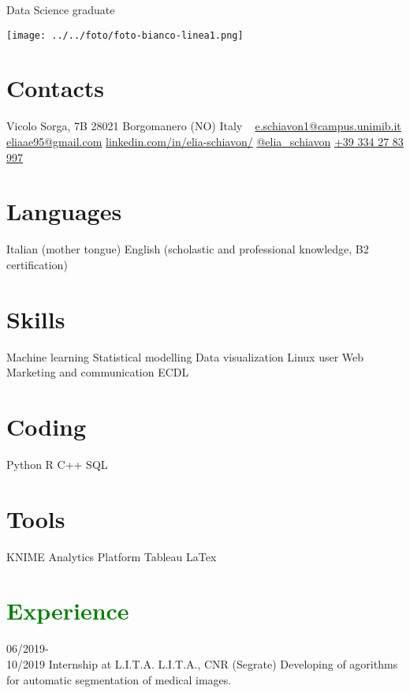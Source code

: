 \documentclass[a4paper]{friggeri-cv}
\begin{document}
       {Data Science graduate}



\begin{aside}
	{\texttt{[image: ../../foto/foto-bianco-linea1.png]}}
  \section{Contacts}
    Vicolo Sorga, 7B
    28021 Borgomanero (NO)
    Italy
    ~
    {\color{gray}{\FA \faEnvelope}} \href{mailto:e.schiavon1@campus.unimib.it}{e.schiavon1@campus.unimib.it}
    {\color{gray}{\FA \faEnvelope}} \href{mailto:eliaae95@gmail.com}{eliaae95@gmail.com}
    {\color{cyan}{\FA \faLinkedinSquare}} \href{https://www.linkedin.com/in/elia-schiavon/}{linkedin.com/in/elia-schiavon/}
    {\color{blue}{\FA \faTwitter}} \href{https://twitter.com/elia_schiavon?s=09}{@elia\_schiavon}
    {\color{black}{\FA \faPhone}} \href{}{+39 334 27 83 997}
  \section{Languages}
    Italian (mother tongue)
    English (scholastic and professional knowledge, B2 certification)
  \section{Skills}
    Machine learning
    Statistical modelling
    Data visualization
    Linux user
    Web Marketing and communication
    ECDL
  \section{Coding}
	Python
	R
	C++
	SQL
  \section{Tools}
	KNIME  Analytics Platform
	Tableau
	LaTex
\end{aside}

\section{\textcolor{green}{Experience}}

\begin{entrylist}
	\entry
	{06/2019-\\10/2019}
	{Internship at L.I.T.A.}
	{L.I.T.A., CNR (Segrate)}
	{Developing of agorithms for automatic segmentation of medical images.}
\end{entrylist}
\end{document}
